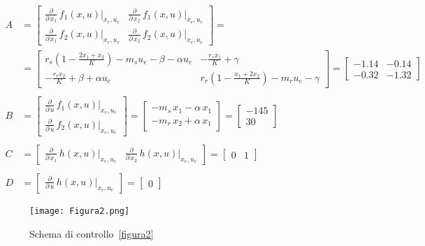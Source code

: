 \documentclass[a4paper, 11pt]{article}
\begin{document}
\begin{subequations}\label{eq:matrices}
\begin{align}
	A &= \begin{bmatrix}
		\frac{\partial}{\partial\,x_1}\,f_1(x,u)\bigg|_{x_e,u_e} & \frac{\partial}{\partial\,x_2}\,f_1(x,u)\bigg|_{x_e,u_e}
		\\
		\frac{\partial}{\partial\,x_1}\,f_2(x,u)\bigg|_{x_e,u_e} & \frac{\partial}{\partial\,x_2}\,f_2(x,u)\bigg|_{x_e,u_e}
	\end{bmatrix} 
	= 
	 \\ &= \begin{bmatrix}
r_s \left(1 - \frac{2x_1 + x_2}{K} \right) - m_s u_e - \beta - \alpha u_e  & -\frac{r_s x_1}{K} + \gamma
		\\
-\frac{r_r x_2}{K} + \beta + \alpha u_e & r_r \left( 1 - \frac{x_1+2x_2}{K} \right) - m_r u_e - \gamma
\end{bmatrix}
	=
	\begin{bmatrix}
		-1.14 & -0.14
		\\
		-0.32 & -1.32
	\end{bmatrix}
	\\ \\ 
	B &= \begin{bmatrix}
		\frac{\partial}{\partial\,u}\,f_1(x,u)\bigg|_{x_e,u_e}
		\\
		\frac{\partial}{\partial\,u}\,f_2(x,u)\bigg|_{x_e,u_e}
	\end{bmatrix}
	=
	\begin{bmatrix}
		-m_s\,x_1-\alpha\,x_1
		\\
		-m_r\,x_2+\alpha\,x_1
	\end{bmatrix}
	=
	\begin{bmatrix}
		-145
		\\
		30
	\end{bmatrix}
	\\ \\
	C &= \begin{bmatrix}
		\frac{\partial}{\partial\,x_1}\,h(x,u)\bigg|_{x_e,u_e} & \frac{\partial}{\partial\,x_2}\,h(x,u)\bigg|_{x_e,u_e}
	\end{bmatrix}
	=\begin{bmatrix}
		0 & 1
	\end{bmatrix}
	\\ \\
	D &= \begin{bmatrix}
		\frac{\partial}{\partial\,u}\,h(x,u)\bigg|_{x_e,u_e}
	\end{bmatrix}
	= \begin{bmatrix}
	0
\end{bmatrix}
\end{align}
\end{subequations}
%
\begin{figure}[h!]
    \centering
    \texttt{[image: Figura2.png]}
    \caption{Schema di controllo~\eqref{figura2}}
    \label{figura2}
\end{figure}
\end{document}
